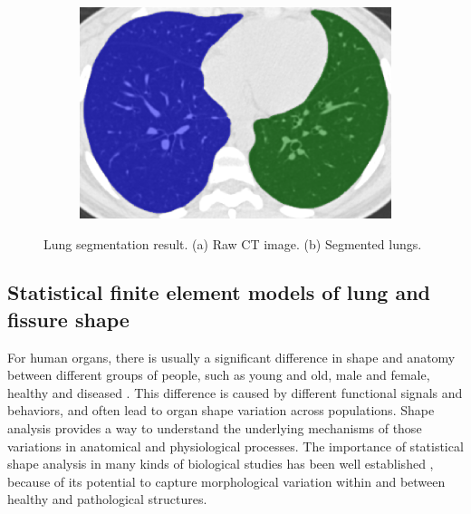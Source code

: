 \begin{figure}[htbp]
\begin{subfigure}{.4\linewidth}
  \includegraphics[width=\linewidth,trim={{.0\wd0} {.0\wd0} {.0\wd0} {.0\wd0}},clip]{Segmentation/Image/LungSegmentationAfter.png}
  \caption{}
  \label{fig:LungSegmentation-b} 
\end{subfigure}
\caption{Lung segmentation result. (a) Raw CT image. (b) Segmented lungs.}
\label{fig:LungSegmentation}
\end{figure}

\subsection{Statistical finite element models of lung and fissure shape} \label{ShapeModelGeneration}
For human organs, there is usually a significant difference in shape and anatomy between different groups of people, such as young and old, male and female, healthy and diseased \citep{krumpe1985aging, crapo1993aging}. This difference is caused by different functional signals and behaviors, and often lead to organ shape variation across populations. Shape analysis provides a way to understand the underlying mechanisms of those variations in anatomical and physiological processes. The importance of statistical shape analysis in many kinds of biological studies has been well established \citep{dryden1998statistical,stegmann2002brief,styner2003statistical,heimann2009statistical}, because of its potential to capture morphological variation within and between healthy and pathological structures.

